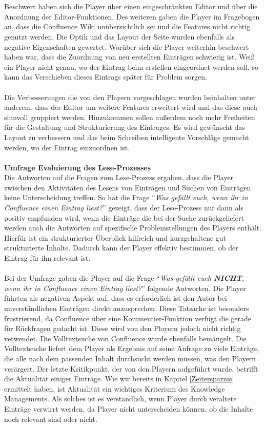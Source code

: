 \documentclass[a4paper,12pt]{scrartcl}
\begin{document}
\\\\
Beschwert haben sich die Player über einen eingeschränkten Editor und über die Anordnung der Editor-Funktionen. Des weiteren gaben die Player im Fragebogen an, dass die Confluence Wiki unübersichtlich sei und die Features nicht richtig genutzt werden. Die Optik und das Layout der Seite wurden ebenfalls als negative Eigenschaften gewertet. Worüber sich die Player weiterhin beschwert haben war, dass die Zuordnung von neu erstellten Einträgen schwierig ist. Weiß ein Player nicht genau, wo der Eintrag beim erstellen eingeordnet werden soll, so kann das Verschieben dieses Eintrags später für Problem sorgen.
\\\\
Die Verbesserungen die von den Playern vorgeschlagen wurden beinhalten unter anderem, dass der Editor um weitere Features erweitert wird und das diese auch sinnvoll gruppiert werden. Hinzukommen sollen außerdem noch mehr Freiheiten für die Gestaltung und Strukturierung des Eintrages. Es wird gewünscht das Layout zu verbessern und das beim Schreiben intelligente Vorschläge gemacht werden, wo der Eintrag einzuordnen ist.
\\\\
\textbf{Umfrage Evaluierung des Lese-Prozesses}\\
Die Antworten auf die Fragen zum Lese-Prozess ergaben, dass die Player zwischen den Aktivitäten des Lesens von Einträgen und Suchen von Einträgen keine Unterscheidung treffen. So hat die Frage \enquote{\textit{Was gefällt euch, wenn ihr in Confluence einen Eintrag liest?}} gezeigt, dass der Lese-Prozess nur dann als positiv empfunden wird, wenn die Einträge die bei der Suche zurückgeliefert werden auch die Antworten auf spezifische Problemstellungen des Players enthält. Hierfür ist ein strukturierter Überblick hilfreich und kurzgehaltene gut strukturierte Inhalte. Dadurch kann der Player effektiv bestimmen, ob der Eintrag für ihn relevant ist. 
\\\\
Bei der Umfrage gaben die Player auf die Frage \enquote{\textit{Was gefällt euch \textbf{NICHT}, wenn ihr in Confluence einen Eintrag liest?}} folgende Antworten. Die Player führten als negativen Aspekt auf, dass es erforderlich ist den Autor bei unverständlichen Einträgen direkt anzusprechen. Diese Tatsache ist besonders frustrierend, da Confluence über eine Kommentier-Funktion verfügt die gerade für Rückfragen gedacht ist. Diese wird von den Playern jedoch nicht richtig verwendet. Die Volltextsuche von Confluence wurde ebenfalls bemängelt. Die Volltextsuche liefert dem Player als Ergebnis auf seine Anfrage zu viele Einträge, die alle nach dem passenden Inhalt durchsucht werden müssen, was den Playern verärgert. Der letzte Kritikpunkt, der von den Playern aufgeführt wurde, betrifft die Aktualität einiger Einträge. Wie wir bereits in Kapitel \ref{Zeitersparnis} ermittelt haben, ist Aktualität ein wichtiges Kriterium des Knowledge Managements. Als solches ist es verständlich, wenn Player durch veraltete Einträge verwirrt werden, da Player nicht unterscheiden können, ob die Inhalte noch relevant sind oder nicht. 
\end{document}
